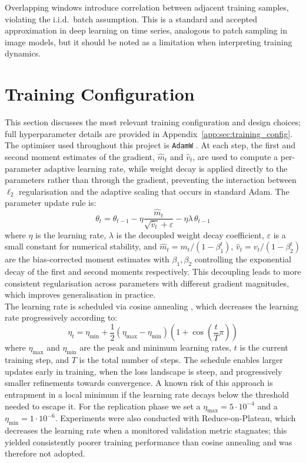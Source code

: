 Overlapping windows introduce correlation between adjacent training samples, violating
the i.i.d.\ batch assumption. This is a standard and accepted approximation in
deep learning on time series, analogous to patch sampling in image models, but it should
be noted as a limitation when interpreting training dynamics.

\section{Training Configuration}

This section discusses the most relevant training configuration and design choices;
full hyperparameter details are provided in Appendix~\ref{app:sec:training_config}.\\

The optimiser used throughout this project is \texttt{AdamW}
\cite{loshchilov2019decoupled}. At each step, the first and second moment estimates
of the gradient, \(\hat{m}_t\) and \(\hat{v}_t\), are used to compute a per-parameter
adaptive learning rate, while weight decay is applied directly to the parameters rather
than through the gradient, preventing the interaction between \(\ell_2\) regularisation
and the adaptive scaling that occurs in standard Adam. The parameter update rule is:
\[
    \theta_t = \theta_{t-1}
        - \eta \frac{\hat{m}_t}{\sqrt{\hat{v}_t} + \varepsilon}
        - \eta \lambda\, \theta_{t-1}
\]
where \(\eta\) is the learning rate, \(\lambda\) is the decoupled weight decay
coefficient, \(\varepsilon\) is a small constant for numerical stability, and
\(\hat{m}_t = m_t / (1 - \beta_1^t)\), \(\hat{v}_t = v_t / (1 - \beta_2^t)\) are the
bias-corrected moment estimates with \(\beta_1, \beta_2\) controlling the exponential
decay of the first and second moments respectively. This decoupling leads to more
consistent regularisation across parameters with different gradient magnitudes, which
improves generalisation in practice.\\

The learning rate is scheduled via cosine annealing \cite{loshchilov2017sgdr}, which
decreases the learning rate progressively according to:
\[
    \eta_t = \eta_{\min} + \frac{1}{2}(\eta_{\max} - \eta_{\min})
    \left(1 + \cos\!\left(\frac{t}{T}\pi\right)\right)
\]
where \(\eta_{\max}\) and \(\eta_{\min}\) are the peak and minimum learning rates,
\(t\) is the current training step, and \(T\) is the total number of steps. The
schedule enables larger updates early in training, when the loss landscape is steep,
and progressively smaller refinements towards convergence. A known risk of this
approach is entrapment in a local minimum if the learning rate decays below the
threshold needed to escape it. For the replication phase we set a \(\eta_\text{max}=5\cdot10^{-4}\) and a \(\eta_{\text{min}}=1\cdot10^{-6}\). Experiments were also conducted with
Reduce-on-Plateau, which decreases the learning rate when a
monitored validation metric stagnates; this yielded consistently poorer training
performance than cosine annealing and was therefore not adopted.\\

